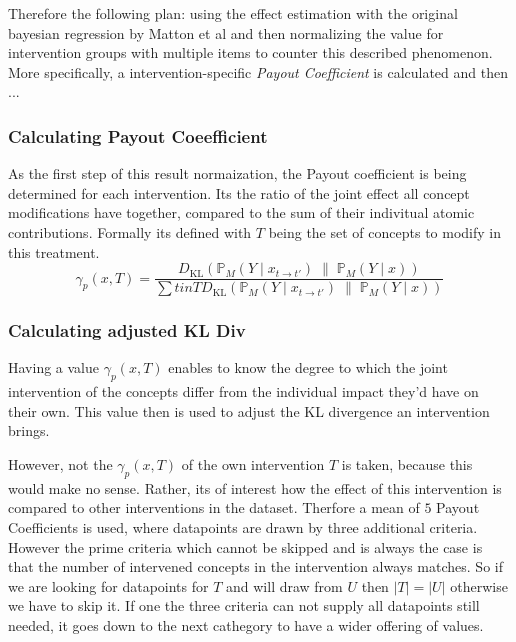 Therefore the following plan: using the effect estimation with the original bayesian regression by Matton et al and then normalizing the value for intervention groups with multiple items to counter this described phenomenon. More specifically, a intervention-specific \emph{Payout Coefficient} is calculated and then ...

\subsubsection{Calculating Payout Coeefficient}
As the first step of this result normaization, the Payout coefficient is being determined for each intervention. Its the ratio of the joint effect all concept modifications have together, compared to the sum of their indivitual atomic contributions. Formally its defined with $T$ being the set of concepts to modify in this treatment.
\begin{equation}
\label{eq:payout_coefficient}
\gamma_p(x, T) = \frac{
D_{\mathrm{KL}}
\left(
\mathbb{P}_M(Y \mid x_{t \rightarrow t'})
\;\middle\|\;
\mathbb{P}_M(Y \mid x)
\right)
}{\sum{t in T}
D_{\mathrm{KL}}
\left(
\mathbb{P}_M(Y \mid x_{t \rightarrow t'})
\;\middle\|\;
\mathbb{P}_M(Y \mid x)
\right)}
\end{equation}

\subsubsection{Calculating adjusted KL Div}
Having a value $\gamma_p(x, T)$ enables to know the degree to which the joint intervention of the concepts differ from the individual impact they'd have on their own. This value then is used to adjust the KL divergence an intervention brings.

However, not the $\gamma_p(x, T)$ of the own intervention $T$ is taken, because this would make no sense. Rather, its of interest how the effect of this intervention is compared to other interventions in the dataset. Therfore a mean of $5$ Payout Coefficients is used, where datapoints are drawn by three additional criteria. However the prime criteria which cannot be skipped and is always the case is that the number of intervened concepts in the intervention always matches. So if we are looking for datapoints for $T$ and will draw from $U$ then $|T| = |U|$ otherwise we have to skip it. If one the three criteria can not supply all datapoints still needed, it goes down to the next cathegory to have a wider offering of values.

